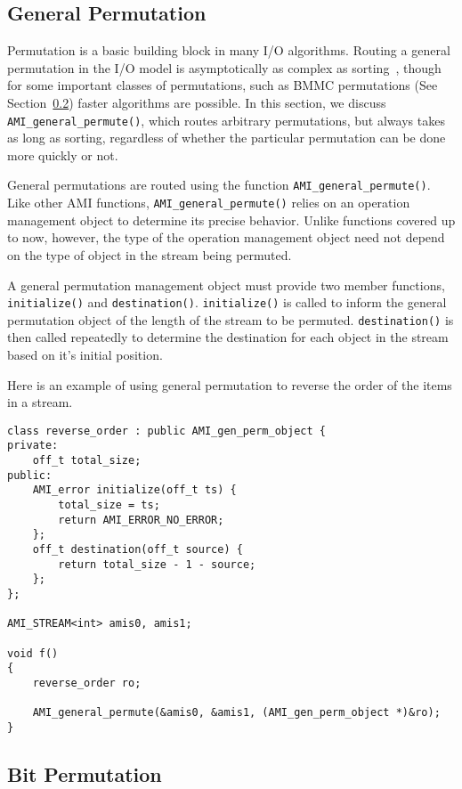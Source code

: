 \subsection{General Permutation}

Permutation is a basic building block in many I/O algorithms. Routing a
general permutation in the I/O model is asymptotically as complex as
sorting~\cite{aggarwal:input}, though for some important classes of
permutations, such as BMMC permutations (See
Section~\ref{sec:bit-permuting}) faster algorithms are possible. In this
section, we discuss
\verb|AMI_general_permute()|, which routes arbitrary permutations, but
always takes as long as sorting, regardless of whether the particular
permutation can be done more quickly or not.

General permutations are routed using the function
\verb|AMI_general_permute()|.  Like other AMI functions,
\verb|AMI_general_permute()| relies on an operation management
object to determine its precise
behavior.  Unlike functions covered up to now, however, the type of
the operation management object
need not depend on the type of object in the stream being permuted.

A general permutation management object must provide two member
functions, \verb|initialize()| and \verb|destination()|.
\verb|initialize()| is called to inform the general permutation object
of the length of the stream to be permuted.  \verb|destination()| is
then called repeatedly to determine the destination for each object in
the stream based on it's initial position.

Here is an example of using general permutation to reverse the order
of the items in a stream.

\begin{verbatim}
class reverse_order : public AMI_gen_perm_object {
private:
    off_t total_size;
public:
    AMI_error initialize(off_t ts) { 
        total_size = ts; 
        return AMI_ERROR_NO_ERROR;
    };
    off_t destination(off_t source) {
        return total_size - 1 - source;
    };
};

AMI_STREAM<int> amis0, amis1;    

void f()
{
    reverse_order ro;

    AMI_general_permute(&amis0, &amis1, (AMI_gen_perm_object *)&ro);
}
\end{verbatim}

\subsection{Bit Permutation}
\label{sec:bit-permuting}

